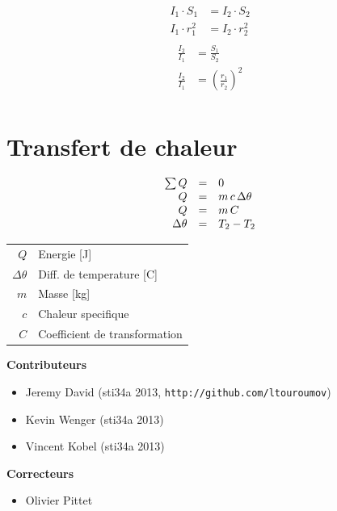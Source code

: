 \documentclass[12pt,a4paper]{article} %
\begin{document}
\begin{twocols}[0.5][0.5]
	\begin{align*}
		I_1 \cdot S_1 &= I_2 \cdot S_2 \\
		I_1 \cdot r_1^2 &= I_2 \cdot r_2^2	\\
	\end{align*}
\nextcol
	\begin{align*}
		\frac{I_2}{I_1} &= \frac{S_1}{S_2} \\
		\frac{I_2}{I_1} &= \left(\frac{r_1}{r_2}\right)^2 \\
	\end{align*}
\end{twocols}
\section{Transfert de chaleur}

\begin{twocols}
	
\begin{equation*}
	\begin{array}{r c l}
		\sum{Q} & = & 0 \\
		Q & = & m\,c\,\Delta\theta \\
		Q & = & m\,C \\
		\Delta\theta & = & T_2 - T_2 \\
	\end{array}
\end{equation*}

\nextcol

	\begin{tabular}{rl}
		$Q$ & Energie [J] \\
		$\Delta\theta$ & Diff. de temperature [C]\\
		$m$ & Masse [kg] \\
		$c$ & Chaleur specifique \\
		$C$ & Coefficient de transformation
	\end{tabular}


\end{twocols}

\newpage

\tableofcontents
\vspace{2em}
\textbf{Contributeurs} \\
\begin{itemize}
	\item Jeremy David (sti34a 2013, \texttt{http://github.com/ltouroumov})
	\item Kevin Wenger (sti34a 2013)
	\item Vincent Kobel (sti34a 2013)
\end{itemize}
\textbf{Correcteurs} \\
\begin{itemize}
	\item Olivier Pittet
\end{itemize}

\end{document}

